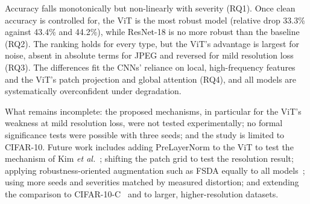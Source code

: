 \documentclass[conference]{IEEEtran}
\begin{document}
Accuracy falls monotonically but non-linearly with severity (RQ1). Once clean accuracy is controlled for, the ViT is the most robust model (relative drop 33.3\% against 43.4\% and 44.2\%), while ResNet-18 is no more robust than the baseline (RQ2). The ranking holds for every type, but the ViT's advantage is largest for noise, absent in absolute terms for JPEG and reversed for mild resolution loss (RQ3). The differences fit the CNNs' reliance on local, high-frequency features and the ViT's patch projection and global attention (RQ4), and all models are systematically overconfident under degradation.

What remains incomplete: the proposed mechanisms, in particular for the ViT's weakness at mild resolution loss, were not tested experimentally; no formal significance tests were possible with three seeds; and the study is limited to CIFAR-10. Future work includes adding PreLayerNorm to the ViT to test the mechanism of Kim \emph{et al.}~\cite{kim2023}; shifting the patch grid to test the resolution result; applying robustness-oriented augmentation such as FSDA equally to all models~\cite{nam2024}; using more seeds and severities matched by measured distortion; and extending the comparison to CIFAR-10-C~\cite{hendrycks2019} and to larger, higher-resolution datasets.



\end{document}
